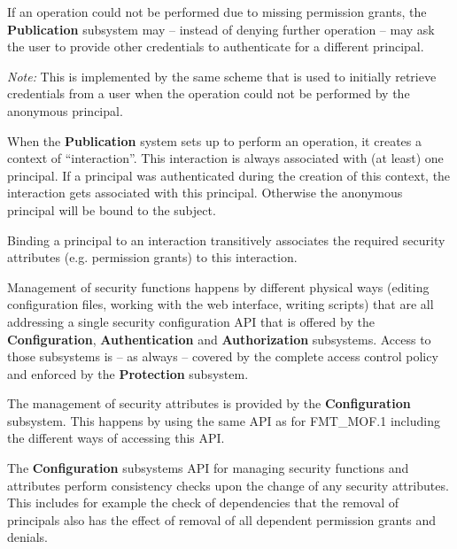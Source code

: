 \documentclass[12pt,english]{scrbook}
\begin{document}

If an operation could not be performed due to missing permission grants, the
\textbf{Publication} subsystem may -- instead of denying further operation --
may ask the user to provide other credentials to authenticate for a different
principal.

\emph{Note:} This is implemented by the same scheme that is used to initially
retrieve credentials from a user when the operation could not be performed by
the anonymous principal.


When the \textbf{Publication} system sets up to perform an operation, it
creates a context of ``interaction''. This interaction is always associated
with (at least) one principal. If a principal was authenticated during the
creation of this context, the interaction gets associated with this principal.
Otherwise the anonymous principal will be bound to the subject.

Binding a principal to an interaction transitively associates the required security
attributes (e.g. permission grants) to this interaction.


Management of security functions happens by different physical ways (editing
configuration files, working with the web interface, writing scripts) that are
all addressing a single security configuration API that is offered by the
\textbf{Configuration}, \textbf{Authentication} and \textbf{Authorization}
subsystems. Access to those subsystems is -- as always -- covered by the
complete access control policy and enforced by the \textbf{Protection}
subsystem.


The management of security attributes is provided by the \textbf{Configuration}
subsystem. This happens by using the same API as for FMT\_MOF.1 including the
different ways of accessing this API.


The \textbf{Configuration} subsystems API for managing security functions and
attributes perform consistency checks upon the change of any security
attributes. This includes for example the check of dependencies that the
removal of principals also has the effect of removal of all dependent
permission grants and denials. 
\end{document}
